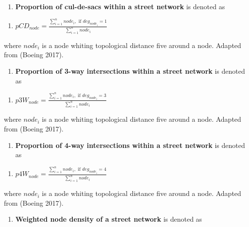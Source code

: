 \documentclass[
  letterpaper,
  DIV=11,
  numbers=noendperiod]{scrartcl}
\providecommand{\tightlist}{%
  \setlength{\itemsep}{0pt}\setlength{\parskip}{0pt}}\usepackage{longtable,booktabs,array}
\begin{document}
\begin{enumerate}
\def\labelenumi{\arabic{enumi}.}
\setcounter{enumi}{46}
\tightlist
\item
  \textbf{Proportion of cul-de-sacs within a street network} is denoted
  as
\end{enumerate}

\begin{enumerate}
\def\labelenumi{(\arabic{enumi})}
\setcounter{enumi}{46}
\tightlist
\item
  \(pCD_{node} = \frac{\sum_{i=1}^{n} node_i, \text { if }deg_{node_i} = 1}{\sum_{i=1}^{n} node_i}\)
\end{enumerate}

where \(node_i\) is a node whiting topological distance five around a
node. Adapted from (Boeing 2017).

\begin{enumerate}
\def\labelenumi{\arabic{enumi}.}
\setcounter{enumi}{47}
\tightlist
\item
  \textbf{Proportion of 3-way intersections within a street network} is
  denoted as
\end{enumerate}

\begin{enumerate}
\def\labelenumi{(\arabic{enumi})}
\setcounter{enumi}{47}
\tightlist
\item
  \(p3W_{node} = \frac{\sum_{i=1}^{n} node_i, \text { if }deg_{node_i} = 3}{\sum_{i=1}^{n} node_i}\)
\end{enumerate}

where \(node_i\) is a node whiting topological distance five around a
node. Adapted from (Boeing 2017).

\begin{enumerate}
\def\labelenumi{\arabic{enumi}.}
\setcounter{enumi}{48}
\tightlist
\item
  \textbf{Proportion of 4-way intersections within a street network} is
  denoted as
\end{enumerate}

\begin{enumerate}
\def\labelenumi{(\arabic{enumi})}
\setcounter{enumi}{48}
\tightlist
\item
  \(p4W_{node} = \frac{\sum_{i=1}^{n} node_i, \text { if }deg_{node_i} = 4}{\sum_{i=1}^{n} node_i}\)
\end{enumerate}

where \(node_i\) is a node whiting topological distance five around a
node. Adapted from (Boeing 2017).

\begin{enumerate}
\def\labelenumi{\arabic{enumi}.}
\setcounter{enumi}{49}
\tightlist
\item
  \textbf{Weighted node density of a street network} is denoted as
\end{enumerate}
\end{document}
